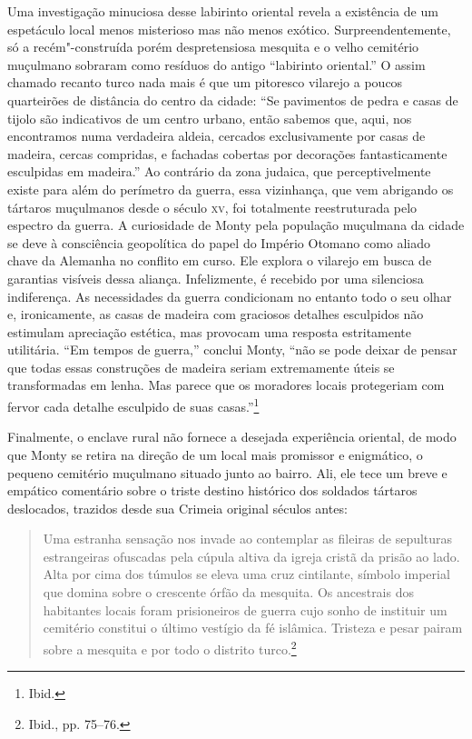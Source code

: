 Uma investigação minuciosa desse labirinto oriental revela a existência
de um espetáculo local menos misterioso mas não menos exótico.
Surpreendentemente, só a recém"-construída porém despretensiosa mesquita
e o velho cemitério muçulmano sobraram como resíduos do antigo
``labirinto oriental.'' O assim chamado recanto turco nada mais é que um
pitoresco vilarejo a poucos quarteirões de distância do centro da
cidade: ``Se pavimentos de pedra e casas de tijolo são indicativos de um
centro urbano, então sabemos que, aqui, nos encontramos numa verdadeira
aldeia, cercados exclusivamente por casas de madeira, cercas compridas,
e fachadas cobertas por decorações fantasticamente esculpidas em
madeira.'' Ao contrário da zona judaica, que perceptivelmente existe
para além do perímetro da guerra, essa vizinhança, que vem abrigando os
tártaros muçulmanos desde o século \textsc{xv}, foi totalmente reestruturada pelo
espectro da guerra. A curiosidade de Monty pela população muçulmana da
cidade se deve à consciência geopolítica do papel do Império Otomano
como aliado chave da Alemanha no conflito em curso. Ele explora o
vilarejo em busca de garantias visíveis dessa aliança. Infelizmente, é
recebido por uma silenciosa indiferença. As necessidades da guerra
condicionam no entanto todo o seu olhar e, ironicamente, as casas de
madeira com graciosos detalhes esculpidos não estimulam apreciação
estética, mas provocam uma resposta estritamente utilitária. ``Em tempos
de guerra,'' conclui Monty, ``não se pode deixar de pensar que todas
essas construções de madeira seriam extremamente úteis se transformadas
em lenha. Mas parece que os moradores locais protegeriam com fervor cada
detalhe esculpido de suas casas.''\footnote{Ibid.}

Finalmente, o enclave rural não fornece a desejada experiência oriental,
de modo que Monty se retira na direção de um local mais promissor e
enigmático, o pequeno cemitério muçulmano situado junto ao bairro. Ali,
ele tece um breve e empático comentário sobre o triste destino histórico
dos soldados tártaros deslocados, trazidos desde sua Crimeia original
séculos antes:

\begin{quote}
Uma estranha sensação nos invade ao contemplar as fileiras de sepulturas
estrangeiras ofuscadas pela cúpula altiva da igreja cristã da prisão ao
lado. Alta por cima dos túmulos se eleva uma cruz cintilante, símbolo
imperial que domina sobre o crescente órfão da mesquita. Os ancestrais
dos habitantes locais foram prisioneiros de guerra cujo sonho de
instituir um cemitério constitui o último vestígio da fé islâmica.
Tristeza e pesar pairam sobre a mesquita e por todo o distrito
turco.\footnote{Ibid., pp. 75--76.}
\end{quote}

